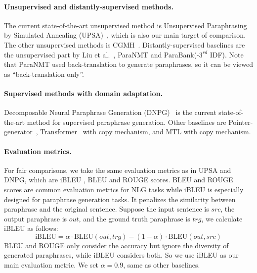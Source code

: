 \paragraph{Unsupervised and distantly-supervised methods. } The current state-of-the-art unsupervised method is Unsupervised Paraphrasing by Simulated Annealing (UPSA)~\cite{liu2019unsupervised}, which is also our main target of comparison. The other unsupervised methods is CGMH~\cite{miao2019cgmh}. 
Distantly-supervised baselines are the unsupervised part by 
Liu et al.~\cite{liu2020exploring}, ParaNMT and ParaBank(-$3^{rd}$ IDF). 
Note that ParaNMT used back-translation to generate paraphrases, 
so it can be viewed as ``back-translation only''.

\paragraph{Supervised methods with domain adaptation. } Decomposable Neural Paraphrase Generation (DNPG)~\cite{li2019decomposable} is the current 
state-of-the-art method for supervised paraphrase generation.
Other baselines are Pointer-generator~\cite{see2017get}, Transformer~\cite{vaswani2017attention} with copy mechanism, and MTL\cite{domhan2017using} with copy 
mechanism. 

\paragraph{Evaluation metrics. } For fair comparisons, 
we take the same evaluation metrics as in UPSA and 
DNPG, which are iBLEU \cite{sun2012joint}, BLEU \cite{papineni2002bleu} and ROUGE \cite{lin2004rouge} scores. 
BLEU and ROUGE scores are common evaluation metrics for NLG tasks while 
iBLEU is especially designed for paraphrase generation tasks. 
It penalizes the similarity between paraphrase and the original sentence. 
Suppose the input sentence is $src$, the output paraphrase is $out$, 
and the ground truth paraphrase is $trg$, we calculate iBLEU as follows:
\begin{equation}
\text{iBLEU} = \alpha \cdot \text{BLEU}(out, trg) - (1-\alpha) \cdot 
\text{BLEU}(out, src)\label{equ:ibleu}
\end{equation}
BLEU and ROUGE only consider the accuracy but ignore the 
diversity of generated paraphrases, while iBLEU considers both. 
So we use iBLEU as our main evaluation metric.
We set $\alpha=0.9$, same as other baselines.

